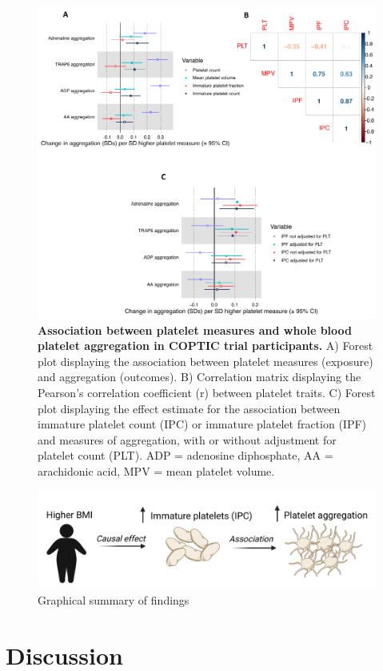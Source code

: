 \documentclass[11pt,twoside]{bristolthesis}
\begin{document}
\begin{figure}
\includegraphics[width=0.85\linewidth]{figure/BMI_platelets/IPC_aggregation} \caption[Association between platelet measures and whole blood platelet aggregation in COPTIC trial participants]{\textbf{Association between platelet measures and whole blood platelet aggregation in COPTIC trial participants.} A) Forest plot displaying the association between platelet measures (exposure) and aggregation (outcomes). B) Correlation matrix displaying the Pearson's correlation coefficient (r) between platelet traits. C) Forest plot displaying the effect estimate for the association between immature platelet count (IPC) or immature platelet fraction (IPF) and measures of aggregation, with or without adjustment for platelet count (PLT). ADP = adenosine diphosphate, AA = arachidonic acid, MPV = mean platelet volume.}\label{fig:IPC-aggregation}
\end{figure}

\begin{figure}
\includegraphics[width=0.9\linewidth]{figure/BMI_platelets/Visual_abstract} \caption{Graphical summary of findings}\label{fig:BMI-platelet-cartoon}
\end{figure}
\hypertarget{discussion}{%
\section{Discussion}\label{discussion}}
\end{document}
